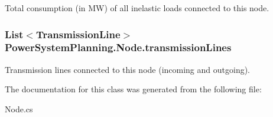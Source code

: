 Total consumption (in MW) of all inelastic loads connected to this node. 

\subsubsection[{\texorpdfstring{transmission\+Lines}{transmissionLines}}]{\setlength{\rightskip}{0pt plus 5cm}List$<${\bf Transmission\+Line}$>$ Power\+System\+Planning.\+Node.\+transmission\+Lines\hspace{0.3cm}{\ttfamily [get]}}\hypertarget{class_power_system_planning_1_1_node_a2c8bd0b05dfcb3cb54e143a6cff2b52f}{}\label{class_power_system_planning_1_1_node_a2c8bd0b05dfcb3cb54e143a6cff2b52f}


Transmission lines connected to this node (incoming and outgoing). 



The documentation for this class was generated from the following file\+:\begin{DoxyCompactItemize}
\item 
Node.\+cs\end{DoxyCompactItemize}
